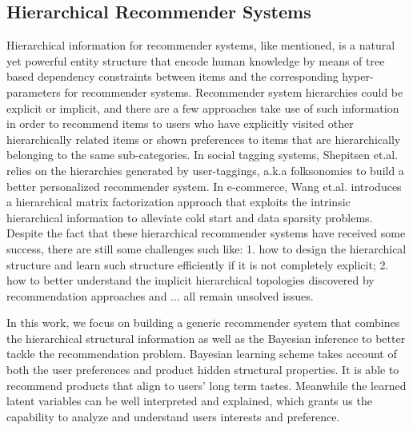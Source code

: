 \subsection{Hierarchical Recommender Systems}

Hierarchical information for recommender systems, like mentioned, is a natural yet powerful entity structure that encode human knowledge by means of tree based dependency constraints between items and the corresponding hyper-parameters for recommender systems.  Recommender system hierarchies could be explicit or implicit, and there are a few approaches take use of such information in order to recommend items to users who have explicitly visited other hierarchically related items or shown preferences to items that are hierarchically belonging to the same sub-categories.  In social tagging systems, Shepitsen et.al. \cite{shepitsen2008personalized} relies on the hierarchies generated by user-taggings, a.k.a folksonomies to build a better personalized recommender system.  In e-commerce, Wang et.al. \cite{wang2018exploring} introduces a hierarchical matrix factorization approach that exploits the intrinsic hierarchical information to alleviate cold start and data sparsity problems.  Despite the fact that these hierarchical recommender systems have received some success, there are still some challenges such like: 1. how to design the hierarchical structure and learn such structure efficiently if it is not completely explicit; 2. how to better understand the implicit hierarchical topologies discovered by recommendation approaches and ... all remain unsolved issues.

In this work, we focus on building a generic recommender system that combines the hierarchical structural information as well as the Bayesian inference to better tackle the recommendation problem.  Bayesian learning scheme takes account of both the user preferences and product hidden structural properties. It is able to recommend products that align to users' long term tastes. Meanwhile the learned latent variables can be well interpreted and explained, which grants us the capability to analyze and understand users interests and preference.